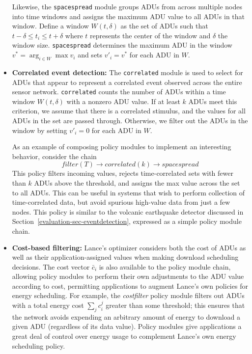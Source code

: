 \begin{itemize}
Likewise, the \texttt{spacespread} module groups ADUs from across multiple
nodes into time windows and assigns the maximum ADU value to all ADUs in that
window. Define a window $W(t,\delta)$ as the set of ADUs such that $t-\delta
\leq t_i \leq t+\delta$ where $t$ represents the center of the window and
$\delta$ the window size. \texttt{spacespread} determines the maximum ADU in
the window $v^* = \arg_{i \in W} \max v_i$ and sets $v'_i = v^{*}$ for each
ADU in $W$.

\item \textbf{Correlated event detection:} The \texttt{correlated} module is
used to select for ADUs that appear to represent a correlated event observed
across the entire sensor network. \texttt{correlated} counts the number of
ADUs within a time window $W(t,\delta)$ with a nonzero ADU value. If at least
$k$ ADUs meet this criterion, we assume that there is a correlated stimulus,
and the values for all ADUs in the set are passed through. Otherwise, we
filter out the ADUs in the window by setting $v'_i = 0$ for each ADU in $W$.

As an example of composing policy modules to implement an interesting
behavior, consider the chain \[
\mathit{filter}(T)\rightarrow\mathit{correlated}(k)\rightarrow\mathit{spacespread}
\] This policy filters incoming values, rejects time-correlated sets with
fewer than $k$ ADUs above the threshold, and assigns the max value across the
set to all ADUs. This can be useful in systems that wish to perform
collection of time-correlated data, but avoid spurious high-value data from
just a few nodes. This policy is similar to the volcanic earthquake detector
discussed in Section~\ref{evaluation-sec-eventdetection}, expressed as a
simple policy module chain.

\item \textbf{Cost-based filtering:} Lance's optimizer considers both the
cost of ADUs as well as their application-assigned values when making
download scheduling decisions. The cost vector $\bar{c}_i$ is also available
to the policy module chain, allowing policy modules to perform their own
adjustments to the ADU value according to cost, permitting applications to
augment Lance's own policies for energy scheduling. For example, the
\textit{costfilter} policy module filters out ADUs with a total energy cost
$\sum_j c_i^j$ greater than some threshold; this ensures that the network
avoids expending an arbitrary amount of energy to download a given ADU
(regardless of its data value). Policy modules give applications a great deal
of control over energy usage to complement Lance's own energy scheduling
policy.


\end{itemize}

